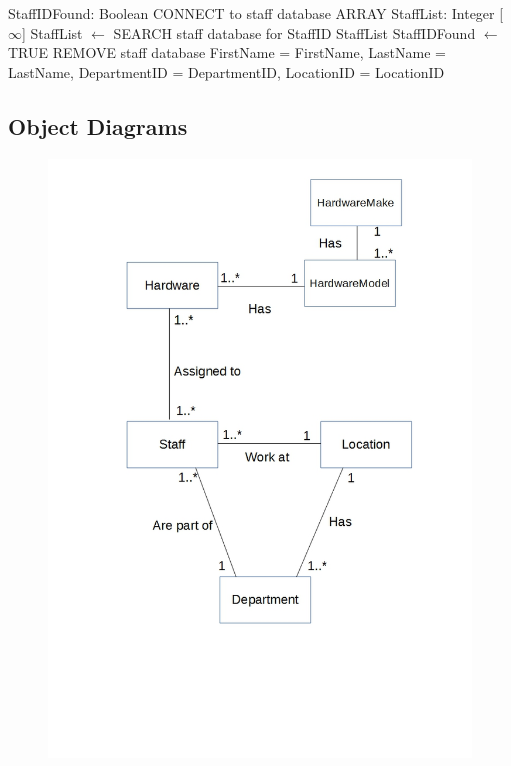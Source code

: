 \begin{algorithm}[H]
\begin{algorithmic}
\State StaffIDFound: Boolean
\State CONNECT to staff database
\State ARRAY StaffList: Integer [$\infty$]
\State StaffList $\leftarrow$ SEARCH staff database for StaffID
 {StaffList}
		\State StaffIDFound $\leftarrow$ TRUE
	\EndIf
\EndFor
{}
	\State REMOVE staff database FirstName = FirstName, LastName = LastName, DepartmentID = DepartmentID, LocationID = LocationID
\EndIf

\EndFunction
\end{algorithmic}
\end{algorithm}

\subsection{Object Diagrams}

\begin{figure}[H]
\hspace*{-1.3cm}
\vspace*{-1cm}
\includegraphics[width=1\textwidth]{RelationshipDiagramDesign.jpg}
\caption{} \label{Relationship Diagrams}
\end{figure}

